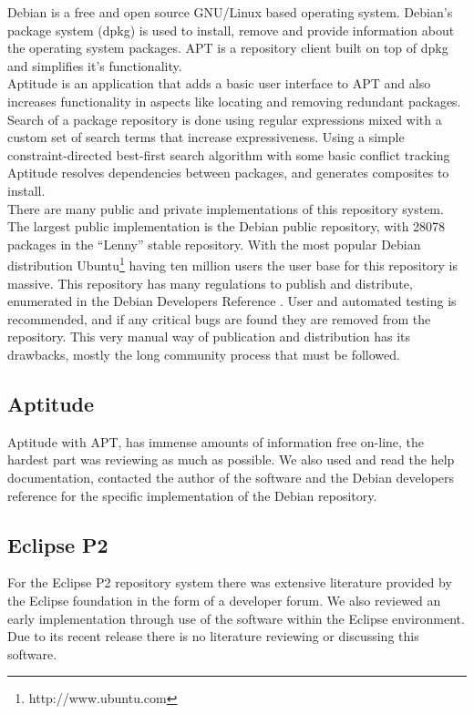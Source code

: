 Debian is a free and open source GNU/Linux based operating system. 
Debian's package system (dpkg) is used to install, remove and provide information about the operating system packages. 
APT is a repository client built on top of dpkg and simplifies it's functionality.\\
Aptitude is an application that adds a basic user interface to APT and also increases functionality in aspects like 
locating and removing redundant packages. 
Search of a package repository is done using regular expressions mixed with a
custom set of search terms that increase expressiveness. Using a simple
constraint-directed best-first search algorithm with some basic conflict
tracking Aptitude resolves dependencies between packages, and generates
composites to install.\\ 
There are many public and private implementations of this repository system. 
The largest public implementation is the Debian public repository, with 28078 packages in the ``Lenny'' stable repository.
With the most popular Debian distribution Ubuntu\footnote{http://www.ubuntu.com} having ten million users \cite{vance_software_2009} the user base for this repository is massive.
This repository has many regulations to publish and distribute, enumerated in the Debian Developers Reference \cite{andreas_barth_debian_2008}. 
User and automated testing is recommended, and if any critical bugs are found they are removed from the repository. 
This very manual way of publication and
distribution has its drawbacks, mostly the long community process that must be followed.\\

\subsection{Aptitude}
Aptitude with APT, has immense amounts of information free on-line, the hardest part was reviewing as much as possible.
We also used and read the help documentation, contacted the author of the software \cite{burrows_modelling_2005} and
the Debian developers reference for the specific implementation of the Debian repository.


\subsection{Eclipse P2}

For the Eclipse P2 repository system there was extensive literature provided by the Eclipse foundation in the form of a developer forum.
We also reviewed an early implementation through use of the software within the Eclipse environment.
Due to its recent release there is no literature reviewing or discussing this software.

